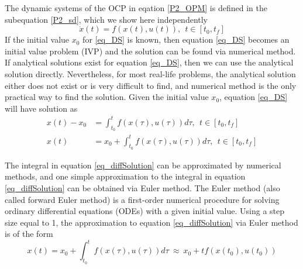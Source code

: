 \documentclass  [
  paper    = a4,
  BCOR     = 10mm,
  twoside,
  fontsize = 12pt,
  fleqn,
  toc      = bibnumbered,
  toc      = listofnumbered,
  numbers  = noendperiod,
  headings = normal,
  listof   = leveldown,
  version  = 3.03
]                                       {scrreprt}
\newcommand{\<}{\langle}
\renewcommand{\>}{\rangle}
\begin{document}
  	The dynamic systems of the OCP in eqation \ref{P2_OPM} is defined in the subequation 
  	\ref{P2_sd}, which we show here independently
  	\begin{equation}
  		\dot{x} (t) = f(x(t), u(t)), \ \   t \in [t_0, t_f]
  		\label{eq_DS}
  	\end{equation}
  	If the initial value $x_0$ for \ref{eq_DS} is known, then equation \ref{eq_DS} becomes an initial value problem (IVP) and the solution can be found via numerical method. If analytical solutions exist for equation \ref{eq_DS}, then we can use the analytical solution directly. Nevertheless, for most real-life problems, the analytical solution either does not exist or is very difficult to find, and numerical method is the only practical way to find the solution. Given the initial value $x_0$, equation \ref{eq_DS} will have solution as 
  	\begin{equation}\label{eq_diffSolution}
  		\begin{aligned}
  			x(t) -  x_0  &= \int_{t_0}^{t}  f(x(\tau), u(\tau)) d \tau,   \ \ t \in [t_0, t_f] \\ 
  			x(t) & = x_0  + \int_{t_0}^{t}  f(x(\tau), u(\tau)) d \tau,   \ \ t \in [t_0, t_f] 
  		\end{aligned}
  	\end{equation}
  	
  	The integral in equation \ref{eq_diffSolution} can be approximated by numerical methods, and one simple approximation to the integral in equation \ref{eq_diffSolution} can be obtained via Euler method. The Euler method (also called forward Euler method) is a first-order numerical procedure for solving ordinary differential equations (ODEs) with a given initial value. Using a step size equal to 1, the approximation to equation \ref{eq_diffSolution} via Euler method is of the form
  	\begin{equation}
  		x(t)  = x_0  + \int_{t_0}^{t}  f(x(\tau), u(\tau)) d \tau \ \approx \   x_0  + t f(x(t_0), u(t_0))
  		\label{eq_Euler_approx}
  	\end{equation}
  	
\end{document}
